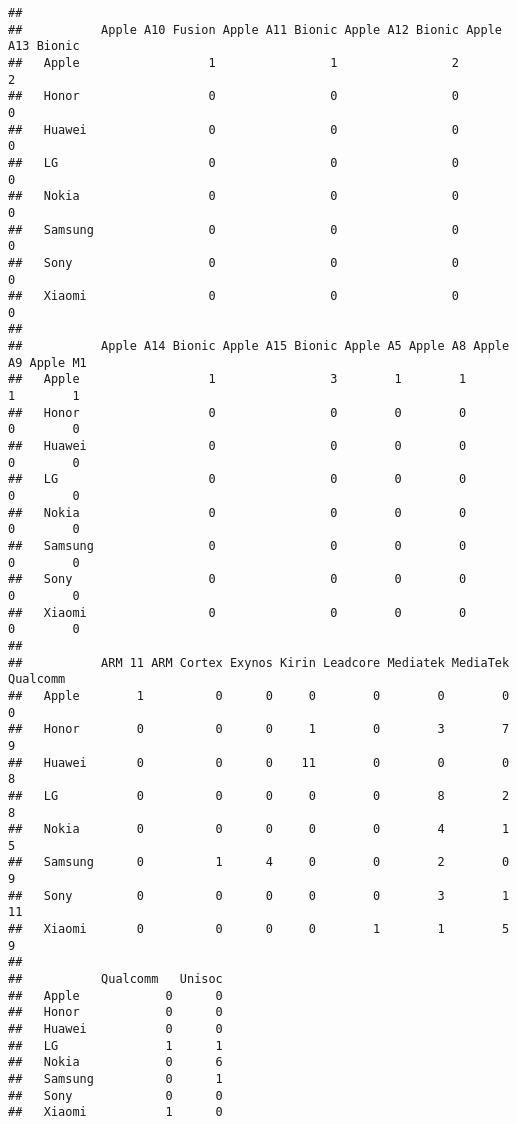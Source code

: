 \documentclass[
]{article}
\begin{document}
\begin{verbatim}
##          
##           Apple A10 Fusion Apple A11 Bionic Apple A12 Bionic Apple A13 Bionic
##   Apple                  1                1                2                2
##   Honor                  0                0                0                0
##   Huawei                 0                0                0                0
##   LG                     0                0                0                0
##   Nokia                  0                0                0                0
##   Samsung                0                0                0                0
##   Sony                   0                0                0                0
##   Xiaomi                 0                0                0                0
##          
##           Apple A14 Bionic Apple A15 Bionic Apple A5 Apple A8 Apple A9 Apple M1
##   Apple                  1                3        1        1        1        1
##   Honor                  0                0        0        0        0        0
##   Huawei                 0                0        0        0        0        0
##   LG                     0                0        0        0        0        0
##   Nokia                  0                0        0        0        0        0
##   Samsung                0                0        0        0        0        0
##   Sony                   0                0        0        0        0        0
##   Xiaomi                 0                0        0        0        0        0
##          
##           ARM 11 ARM Cortex Exynos Kirin Leadcore Mediatek MediaTek Qualcomm
##   Apple        1          0      0     0        0        0        0        0
##   Honor        0          0      0     1        0        3        7        9
##   Huawei       0          0      0    11        0        0        0        8
##   LG           0          0      0     0        0        8        2        8
##   Nokia        0          0      0     0        0        4        1        5
##   Samsung      0          1      4     0        0        2        0        9
##   Sony         0          0      0     0        0        3        1       11
##   Xiaomi       0          0      0     0        1        1        5        9
##          
##           Qualcomm   Unisoc
##   Apple            0      0
##   Honor            0      0
##   Huawei           0      0
##   LG               1      1
##   Nokia            0      6
##   Samsung          0      1
##   Sony             0      0
##   Xiaomi           1      0
\end{verbatim}
\end{document}
